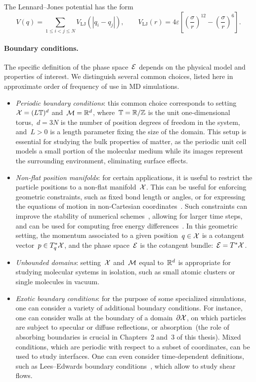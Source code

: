 The Lennard--Jones potential has the form
\begin{equation}
    \label{eq:01:lennard_jones}
    V(q) = \sum_{1\leq i < j \leq N} V_{\mathrm{LJ}}\left(|q_i-q_j|\right),\qquad V_{\mathrm{LJ}}(r) = 4\varepsilon \left[\left(\frac{\sigma}{r}\right)^{12}-\left(\frac{\sigma}{r}\right)^6\right].
\end{equation}

\paragraph{Boundary conditions.}
The specific definition of the phase space~$\mathcal{E}$ depends on the physical model and properties of interest. We distinguish several common choices,  listed here in approximate order of frequency of use in MD simulations.
\begin{itemize}
    \item{\textit{Periodic boundary conditions}: this common choice corresponds to setting~$\mathcal{X} = (L\mathbb{T})^d$ and~$\mathcal{M}=\mathbb{R}^d$, where~$\mathbb{T}=\mathbb{R}/\mathbb{Z}$ is the unit one-dimensional torus,~$d=3N$ is the number of position degrees of freedom in the system, and~$L>0$ is a length parameter fixing the size of the domain. This setup is essential for studying the bulk properties of matter, as the periodic unit cell models a small portion of the molecular medium while its images represent the surrounding environment, eliminating surface effects.}
    \item{\textit{Non-flat position manifolds}: for certain applications, it is useful to restrict the particle positions to a non-flat manifold~$\mathcal{X}$. This can be useful for enforcing geometric constraints, such as fixed bond length or angles, or for expressing the equations of motion in non-Cartesian coordinates~\cite{VJ15}. Such constraints can improve the stability of numerical schemes~\cite{RCB77,A83,BKLS95}, allowing for larger time steps, and can be used for computing free energy differences~\cite{SC98,LRS12}. In this geometric setting, the momentum associated to a given position~$q\in\mathcal{X}$ is a cotangent vector~$p\in T_q^*\mathcal{X}$, and the phase space~$\mathcal{E}$ is the cotangent bundle:~$\mathcal{E}=T^*\mathcal{X}$.}
    \item{\textit{Unbounded domains}: setting~$\mathcal{X}$ and~$\mathcal{M}$ equal to~$\mathbb{R}^d$ is appropriate for studying molecular systems in isolation, such as small atomic clusters or single molecules in vacuum.}
    \item{\textit{Exotic boundary conditions}: for the purpose of some specialized simulations, one can consider a variety of additional boundary conditions. For instance, one can consider walls at the boundary of a domain~$\partial\mathcal{X}$, on which particles are subject to specular or diffuse reflections, or absorption~(the role of absorbing boundaries is crucial in Chapters~2 and~3 of this thesis). Mixed conditions, which are periodic with respect to a subset of coordinates, can be used to study interfaces. One can even consider time-dependent definitions, such as Lees--Edwards boundary conditions~\cite{LE72}, which allow to study shear flows.}
\end{itemize}

